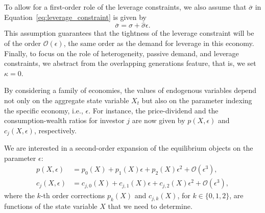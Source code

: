 To allow for a first-order role of the leverage constraints, we also assume that $\overline{\sigma}$ in Equation~\eqref{eq:leverage_constraint} is given by
\begin{equation}\label{eq:sig_bar-perturb}
    \overline{\sigma} = \sigma + \hat{\sigma} \epsilon.
\end{equation}
This assumption guarantees that the tightness of the leverage constraint will be of the order $\mathcal{O}(\epsilon)$, the same order as the demand for leverage in this economy. 
Finally, to focus on the role of heterogeneity, passive demand, and leverage constraints, we abstract from the overlapping generations feature, that is, we set $\kappa = 0$. 

By considering a family of economies, the values of endogenous variables depend not only on the aggregate state variable $X_t$ but also on the parameter indexing the specific economy, i.e., $\epsilon$. For instance, the price-dividend and the consumption-wealth ratios for investor $j$ are now given by $p(X,\epsilon)$ and  $c_j(X,\epsilon)$, respectively. 

We are interested in a second-order expansion of the equilibrium objects on the parameter $\epsilon$:
\begin{align}
    p(X,\epsilon) &= p_{0}(X) + p_{1}(X) \epsilon + p_{2}(X) \epsilon^2 + \mathcal{O}(\epsilon^3), \\
    c_{j}(X,\epsilon) &= c_{j,0}(X) + c_{j,1}(X) \epsilon + c_{j,2}(X) \epsilon^2 + \mathcal{O}(\epsilon^3),
\end{align}
where the $k$-th order corrections $p_k(X)$ and $c_{j,k}(X)$, for $k\in\{0,1,2\}$, are functions of the state variable $X$ that we need to determine.%

